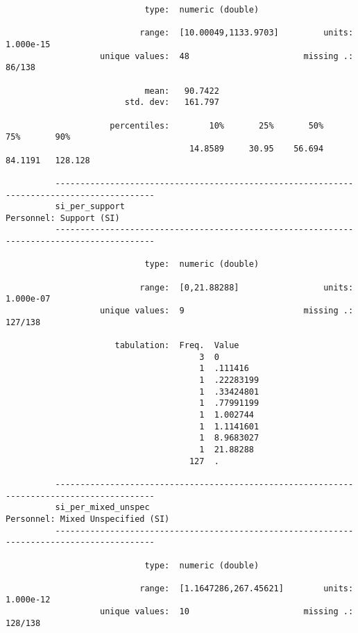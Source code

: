 \documentclass{article}
\begin{document}
\begin{verbatim}
                            type:  numeric (double)
          
                           range:  [10.00049,1133.9703]         units:  1.000e-15
                   unique values:  48                       missing .:  86/138
          
                            mean:   90.7422
                        std. dev:   161.797
          
                     percentiles:        10%       25%       50%       75%       90%
                                     14.8589     30.95    56.694   84.1191   128.128
          
          ------------------------------------------------------------------------------------------
          si_per_support                                                     Personnel: Support (SI)
          ------------------------------------------------------------------------------------------
          
                            type:  numeric (double)
          
                           range:  [0,21.88288]                 units:  1.000e-07
                   unique values:  9                        missing .:  127/138
          
                      tabulation:  Freq.  Value
                                       3  0
                                       1  .111416
                                       1  .22283199
                                       1  .33424801
                                       1  .77991199
                                       1  1.002744
                                       1  1.1141601
                                       1  8.9683027
                                       1  21.88288
                                     127  .
          
          ------------------------------------------------------------------------------------------
          si_per_mixed_unspec                                      Personnel: Mixed Unspecified (SI)
          ------------------------------------------------------------------------------------------
          
                            type:  numeric (double)
          
                           range:  [1.1647286,267.45621]        units:  1.000e-12
                   unique values:  10                       missing .:  128/138
          

\end{verbatim}
\end{document}

